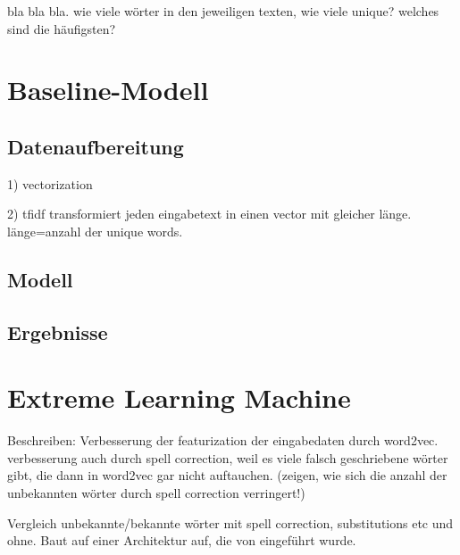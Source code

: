 bla bla bla. wie viele wörter in den jeweiligen texten, wie viele unique? welches sind die häufigsten?
\section{Baseline-Modell}
\subsection{Datenaufbereitung}
1) vectorization

2) tfidf transformiert jeden eingabetext in einen vector mit gleicher länge. länge=anzahl der unique words.
\subsection{Modell}
\subsection{Ergebnisse}
\section{Extreme Learning Machine}
Beschreiben: Verbesserung der featurization der eingabedaten durch word2vec. verbesserung auch durch spell correction, weil es viele falsch geschriebene wörter gibt, die dann in word2vec gar nicht auftauchen. (zeigen, wie sich die anzahl der unbekannten wörter durch spell correction verringert!)

Vergleich unbekannte/bekannte wörter mit spell correction, substitutions etc und ohne.
Baut auf einer Architektur auf, die von \cite{huangExtremeLearningMachine2006} eingeführt wurde.
